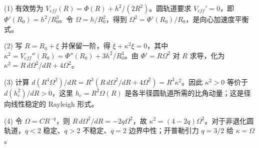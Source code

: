 (1) 有效势为 $V_{eff}(R)=\Phi(R)+h^2/(2R^2)$。圆轨道要求 $V_{eff}'=0$，即 $\Phi'(R_0)=h^2/R_0^3$。令 $\Omega=h/R_0^2$，得到 $\Omega^2=\Phi'(R_0)/R_0$，是向心加速度平衡式。

(2) 写 $R=R_0+\xi$ 并保留一阶，得 $\ddot\xi+\kappa^2\xi=0$，其中 $\kappa^2=V_{eff}''(R_0)=\Phi''(R_0)+3h^2/R_0^4$。由 $\Phi'=R\Omega^2$ 对 $R$ 求导，化为 $\kappa^2=R\,d\Omega^2/dR+4\Omega^2$。

(3) 计算 $d(R^4\Omega^2)/dR=R^3(R\,d\Omega^2/dR+4\Omega^2)=R^3\kappa^2$。因此 $\kappa^2>0$ 等价于 $d(h_c^2)/dR>0$，这里 $h_c=R^2\Omega(R)$ 是各半径圆轨道所需的比角动量；这是径向线性稳定的 Rayleigh 形式。

(4) 令 $\Omega=C R^{-q}$，则 $R\,d\Omega^2/dR=-2q\Omega^2$，故 $\kappa^2=(4-2q)\Omega^2$。对于非退化圆轨道，$q<2$ 稳定、$q>2$ 不稳定、$q=2$ 边界中性；开普勒引力 $q=3/2$ 给 $\kappa=\Omega$。
